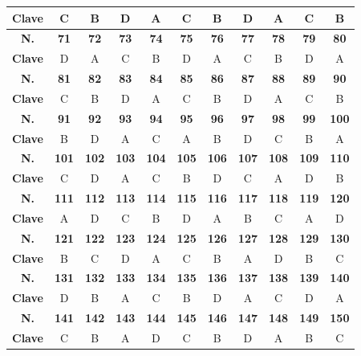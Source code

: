 \begin{center}
\begin{tabular}{|c|c|c|c|c|c|c|c|c|c|c|}
\hline
\textbf{Clave} & C & B & D & A & C & B & D & A & C & B \\
\hline
\textbf{N.} & \textbf{71} & \textbf{72} & \textbf{73} & \textbf{74} & \textbf{75} & \textbf{76} & \textbf{77} & \textbf{78} & \textbf{79} & \textbf{80} \\
\hline
\textbf{Clave} & D & A & C & B & D & A & C & B & D & A \\
\hline
\textbf{N.} & \textbf{81} & \textbf{82} & \textbf{83} & \textbf{84} & \textbf{85} & \textbf{86} & \textbf{87} & \textbf{88} & \textbf{89} & \textbf{90} \\
\hline
\textbf{Clave} & C & B & D & A & C & B & D & A & C & B \\
\hline
\textbf{N.} & \textbf{91} & \textbf{92} & \textbf{93} & \textbf{94} & \textbf{95} & \textbf{96} & \textbf{97} & \textbf{98} & \textbf{99} & \textbf{100} \\
\hline
\textbf{Clave} & B & D & A & C & A & B & D & C & B & A \\
\hline
\textbf{N.} & \textbf{101} & \textbf{102} & \textbf{103} & \textbf{104} & \textbf{105} & \textbf{106} & \textbf{107} & \textbf{108} & \textbf{109} & \textbf{110} \\
\hline
\textbf{Clave} & C & D & A & C & B & D & C & A & D & B \\
\hline
\textbf{N.} & \textbf{111} & \textbf{112} & \textbf{113} & \textbf{114} & \textbf{115} & \textbf{116} & \textbf{117} & \textbf{118} & \textbf{119} & \textbf{120} \\
\hline
\textbf{Clave} & A & D & C & B & D & A & B & C & A & D \\
\hline
\textbf{N.} & \textbf{121} & \textbf{122} & \textbf{123} & \textbf{124} & \textbf{125} & \textbf{126} & \textbf{127} & \textbf{128} & \textbf{129} & \textbf{130} \\
\hline
\textbf{Clave} & B & C & D & A & C & B & A & D & B & C \\
\hline
\textbf{N.} & \textbf{131} & \textbf{132} & \textbf{133} & \textbf{134} & \textbf{135} & \textbf{136} & \textbf{137} & \textbf{138} & \textbf{139} & \textbf{140} \\
\hline
\textbf{Clave} & D & B & A & C & B & D & A & C & D & A \\
\hline
\textbf{N.} & \textbf{141} & \textbf{142} & \textbf{143} & \textbf{144} & \textbf{145} & \textbf{146} & \textbf{147} & \textbf{148} & \textbf{149} & \textbf{150} \\
\hline
\textbf{Clave} & C & B & A & D & C & B & D & A & B & C \\

\end{tabular}
\end{center}
